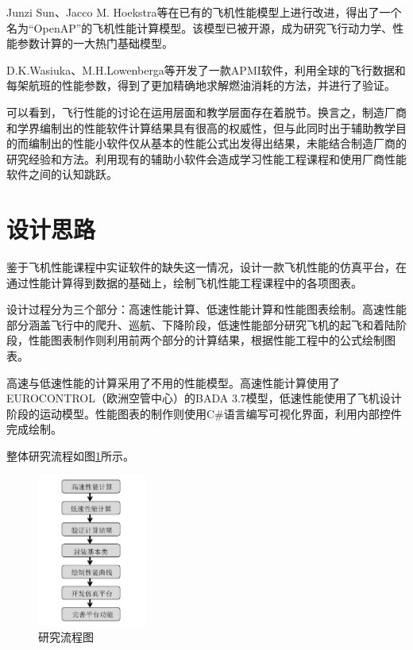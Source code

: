 \documentclass[a4paper,punct,space,heading=true,AutoFakeBold]{ctexrep}
\begin{document}
Junzi Sun、Jacco M. Hoekstra等\cite{sunj}在已有的飞机性能模型上进行改进，得出了一个名为“OpenAP”的飞机性能计算模型。该模型已被开源，成为研究飞行动力学、性能参数计算的一大热门基础模型。

D.K.Wasiuka、M.H.Lowenberga等\cite{Wasiuk}开发了一款APMI软件，利用全球的飞行数据和每架航班的性能参数，得到了更加精确地求解燃油消耗的方法，并进行了验证。

可以看到，飞行性能的讨论在运用层面和教学层面存在着脱节。换言之，制造厂商和学界编制出的性能软件计算结果具有很高的权威性，但与此同时出于辅助教学目的而编制出的性能小软件仅从基本的性能公式出发得出结果，未能结合制造厂商的研究经验和方法。利用现有的辅助小软件会造成学习性能工程课程和使用厂商性能软件之间的认知跳跃。

\section{设计思路}

鉴于飞机性能课程中实证软件的缺失这一情况，设计一款飞机性能的仿真平台，在通过性能计算得到数据的基础上，绘制飞机性能工程课程中的各项图表。

设计过程分为三个部分：高速性能计算、低速性能计算和性能图表绘制。高速性能部分涵盖飞行中的爬升、巡航、下降阶段，低速性能部分研究飞机的起飞和着陆阶段，性能图表制作则利用前两个部分的计算结果，根据性能工程中的公式绘制图表。

高速与低速性能的计算采用了不用的性能模型。高速性能计算使用了EUROCONTROL（欧洲空管中心）的BADA 3.7模型，低速性能使用了飞机设计阶段的运动模型。性能图表的制作则使用C\#语言编写可视化界面，利用内部控件完成绘制。

整体研究流程如图\ref{flowchart}所示。

\begin{figure}[h]
\centering
\includegraphics[width=0.32\textwidth]{pic/flow.pdf}\hspace{30pt}
\caption{研究流程图}\label{flowchart}
\end{figure}
\end{document}
